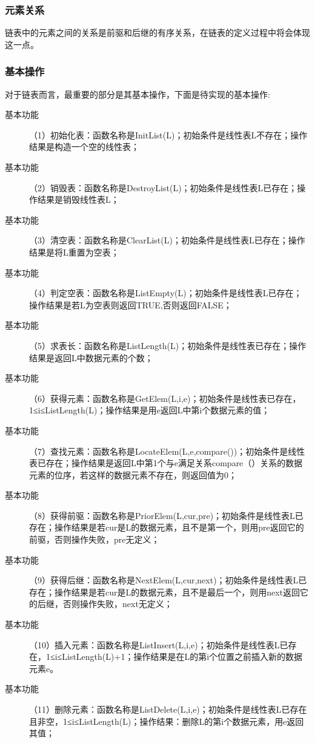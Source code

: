 \documentclass[supercite]{Experimental_Report}
\theoremstyle{definition}
\begin{document}
\subsubsection{元素关系}
链表中的元素之间的关系是前驱和后继的有序关系，在链表的定义过程中将会体现这一点。

\subsubsection{基本操作}
对于链表而言，最重要的部分是其基本操作，下面是待实现的基本操作:

\begin{description}
	\item[基本功能] （1）初始化表：函数名称是InitList(L)；初始条件是线性表L不存在；操作结果是构造一个空的线性表；
	\item[基本功能] （2）销毁表：函数名称是DestroyList(L)；初始条件是线性表L已存在；操作结果是销毁线性表L；
	\item[基本功能] （3）清空表：函数名称是ClearList(L)；初始条件是线性表L已存在；操作结果是将L重置为空表；
	\item[基本功能] （4）判定空表：函数名称是ListEmpty(L)；初始条件是线性表L已存在；操作结果是若L为空表则返回TRUE,否则返回FALSE；
	\item[基本功能] （5）求表长：函数名称是ListLength(L)；初始条件是线性表已存在；操作结果是返回L中数据元素的个数；
	\item[基本功能] （6）获得元素：函数名称是GetElem(L,i,e)；初始条件是线性表已存在，1≤i≤ListLength(L)；操作结果是用e返回L中第i个数据元素的值；
	\item[基本功能] （7）查找元素：函数名称是LocateElem(L,e,compare())；初始条件是线性表已存在；操作结果是返回L中第1个与e满足关系compare（）关系的数据元素的位序，若这样的数据元素不存在，则返回值为0；
	\item[基本功能] （8）获得前驱：函数名称是PriorElem(L,cur,pre)；初始条件是线性表L已存在；操作结果是若cur是L的数据元素，且不是第一个，则用pre返回它的前驱，否则操作失败，pre无定义；
	\item[基本功能] （9）获得后继：函数名称是NextElem(L,cur,next)；初始条件是线性表L已存在；操作结果是若cur是L的数据元素，且不是最后一个，则用next返回它的后继，否则操作失败，next无定义；
	\item[基本功能] （10）插入元素：函数名称是ListInsert(L,i,e)；初始条件是线性表L已存在，1≤i≤ListLength(L)+1；操作结果是在L的第i个位置之前插入新的数据元素e。
	\item[基本功能] （11）删除元素：函数名称是ListDelete(L,i,e)；初始条件是线性表L已存在且非空，1≤i≤ListLength(L)；操作结果：删除L的第i个数据元素，用e返回其值；

\end{description}
\end{document}
